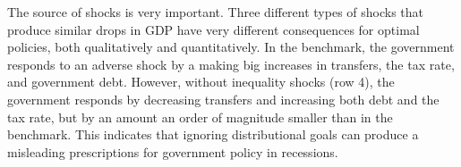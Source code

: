 \documentclass[thmsb,11pt]{article}
\begin{document}
The source of shocks is very important. Three different types of shocks
that produce similar drops in GDP  have very different consequences for optimal policies, both qualitatively and
quantitatively. %
In the benchmark, the government responds to an adverse shock by a making big increases in transfers, the  tax rate, and  government debt. However, without inequality shocks (row 4), the government
responds by decreasing transfers and  increasing both debt and
the tax rate, but by an amount an order of magnitude smaller than in the benchmark. This  indicates that ignoring distributional goals can produce a misleading prescriptions for government
policy in recessions.
\end{document}

